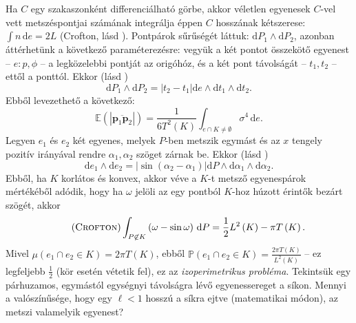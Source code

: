 \documentclass[DIV=15,appendixprefix]{scrreprt}
\theoremstyle{definition}
\theoremstyle{remark}
\newcommand{\mean}{\mathbb{E}}
\newcommand{\prob}{\mathbb{P}}
\begin{document}
Ha $ C $ egy szakaszonként differenciálható
görbe, akkor véletlen egyenesek $ C $-vel vett metszéspontjai számának integrálja éppen $ C $
hosszának kétszerese: $ \int n \, \mathrm{ d } e = 2 L $ (Crofton, lásd \cite[31.~oldal]{Santalo}).
%
Pontpárok sűrűségét láttuk: $ \mathrm{ d } P_{ 1 } \wedge \mathrm{ d } P_{ 2 } $, azonban
áttérhetünk a következő paraméterezésre: vegyük a két pontot összekötő egyenest -- $ e\colon p,{}
\phi $ -- a legközelebbi pontját az origóhóz, és a két pont távolságát -- $t_{ 1 }, {} t_{ 2 }$ --
ettől a ponttól. Ekkor (lásd \cite[46.~oldal]{Santalo})
\begin{equation*}
	 \mathrm{ d } P_{ 1 } \wedge \mathrm{ d } P_{ 2 } = \left| t_{ 2 } - t_{ 1 }\right| \mathrm{ d }
	 e \wedge \mathrm{ d } t_{ 1 } \wedge \mathrm{ d } t_{ 2 }.
\end{equation*}
Ebből levezethető a következő:
\begin{equation*}
	\mean \left( \left| \overline{ \mathbf{ p }_{ 1 } \mathbf{ p }_{ 2 } }\right| \right) =
	\frac{ 1 }{ 6 T^{ 2 } \left( K \right) } \int_{ e \cap K \neq \emptyset } \sigma^{ 4 } \,
	\mathrm{ d } e.
\end{equation*}
Legyen $ e_{ 1 } $ és $ e_{ 2 } $ két egyenes, melyek $ P $-ben metszik egymást és az $ x $ tengely
pozitív irányával rendre $ \alpha_{ 1 },{} \alpha_{ 2 } $ szöget zárnak be. Ekkor (lásd
\cite[49.~oldal]{Santalo})
\begin{equation*}
	\mathrm{ d } e_{ 1 } \wedge \mathrm{ d } e_{ 2 } = \left| \sin \left( \alpha_{ 2 } -
	\alpha_{ 1 } \right) \right| \mathrm{ d } P \wedge \mathrm{ d } \alpha_{ 1 } \wedge
	\mathrm{ d } \alpha_{ 2 }.
\end{equation*}
Ebből, ha $ K $ korlátos és konvex, akkor véve a $ K $-t metsző egyenespárok mértékéből adódik,
hogy ha $ \omega $ jelöli az egy pontból $ K $-hoz húzott érintők bezárt szögét, akkor
\begin{equation}\tag{\textsc{Crofton}}
	\int_{ P \not \in K } \left( \omega - \sin \omega  \right) \, \mathrm{ d } P = \frac{ 1 }{ 2 }
	L^{ 2 } \left( K \right) - \pi T \left( K \right).
\end{equation}
Mivel $ \mu \left( e_{ 1 } \cap e_{ 2 } \in K \right) = 2 \pi T \left( K \right) $, ebből $ \prob
\left( e_{ 1 } \cap e_{ 2 } \in K \right) = \frac{ 2 \pi T \left( K \right) }{ L^{ 2 } \left( K
\right) } $ -- ez legfeljebb $ \frac{ 1 }{ 2 } $ (kör esetén vétetik fel), ez az
\emph{izoperimetrikus probléma}.
%
Tekintsük egy párhuzamos, egymástól egységnyi távolságra lévő egyenessereget a síkon. Mennyi a
valószínűsége, hogy egy $ \ell < 1 $ hosszú  a síkra ejtve (matematikai módon), az
metszi valamelyik egyenest?
\end{document}
